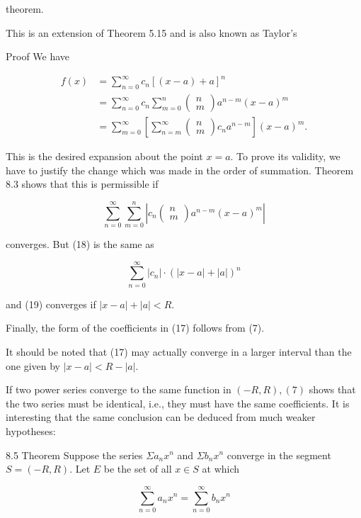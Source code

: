 \documentclass[10pt]{article}
\begin{document}
theorem.

This is an extension of Theorem 5.15 and is also known as Taylor's

Proof We have

$$
\begin{aligned}
f(x) & =\sum_{n=0}^{\infty} c_{n}[(x-a)+a]^{n} \\
& =\sum_{n=0}^{\infty} c_{n} \sum_{m=0}^{n}\left(\begin{array}{l}
n \\
m
\end{array}\right) a^{n-m}(x-a)^{m} \\
& =\sum_{m=0}^{\infty}\left[\sum_{n=m}^{\infty}\left(\begin{array}{l}
n \\
m
\end{array}\right) c_{n} a^{n-m}\right](x-a)^{m} .
\end{aligned}
$$

This is the desired expansion about the point $x=a$. To prove its validity, we have to justify the change which was made in the order of summation. Theorem 8.3 shows that this is permissible if

$$
\sum_{n=0}^{\infty} \sum_{m=0}^{n}\left|c_{n}\left(\begin{array}{l}
n \\
m
\end{array}\right) a^{n-m}(x-a)^{m}\right|
$$

converges. But (18) is the same as

$$
\sum_{n=0}^{\infty}\left|c_{n}\right| \cdot(|x-a|+|a|)^{n}
$$

and (19) converges if $|x-a|+|a|<R$.

Finally, the form of the coefficients in (17) follows from (7).

It should be noted that (17) may actually converge in a larger interval than the one given by $|x-a|<R-|a|$.

If two power series converge to the same function in $(-R, R),(7)$ shows that the two series must be identical, i.e., they must have the same coefficients. It is interesting that the same conclusion can be deduced from much weaker hypotheses:

8.5 Theorem Suppose the series $\Sigma a_{n} x^{n}$ and $\Sigma b_{n} x^{n}$ converge in the segment $S=(-R, R)$. Let $E$ be the set of all $x \in S$ at which

$$
\sum_{n=0}^{\infty} a_{n} x^{n}=\sum_{n=0}^{\infty} b_{n} x^{n}
$$
\end{document}
